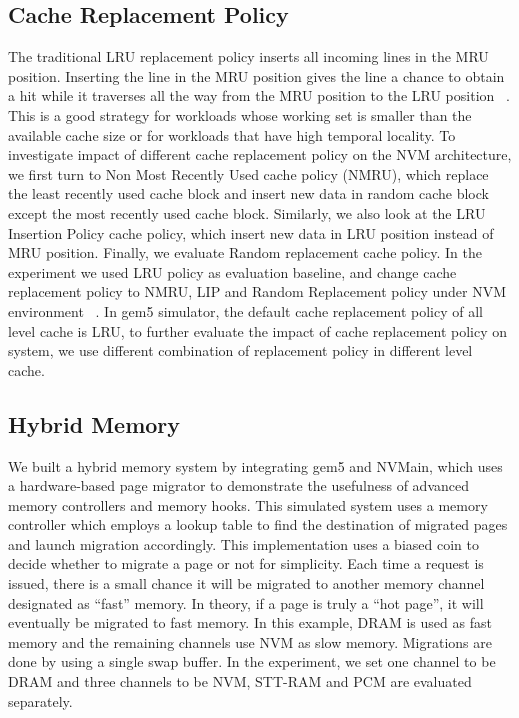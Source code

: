 \subsection{Cache Replacement Policy}
The traditional LRU replacement policy inserts all incoming lines in the MRU position. Inserting the line in the MRU position gives the line a chance to obtain a hit while it traverses all the way from the MRU position to the LRU position ~\cite{fan}. This is a good strategy for workloads whose working set is smaller than the available cache size or for workloads that have high temporal locality. To investigate impact of different cache replacement policy on the NVM architecture, we first turn to Non Most Recently Used cache policy (NMRU), which replace the least recently used cache block and insert new data in random cache block except the most recently used cache block. Similarly, we also look at the LRU Insertion Policy cache policy, which insert new data in LRU position instead of MRU position. Finally, we evaluate Random replacement cache policy.  In the experiment we used LRU policy as evaluation baseline, and change cache replacement policy to NMRU, LIP and Random Replacement policy under NVM environment ~\cite{Qureshi}. In gem5 simulator, the default cache replacement policy of all level cache is LRU, to further evaluate the impact of cache replacement policy on system, we use different combination of replacement policy in different level cache.     



\subsection{Hybrid Memory}
We built a hybrid memory system by integrating gem5 and NVMain, which uses a hardware-based page migrator to demonstrate the usefulness of advanced memory controllers and memory hooks. This simulated system uses a memory controller which employs a lookup table to find the destination of migrated pages and launch migration accordingly. This implementation uses a biased coin to decide whether to migrate a page or not for simplicity. Each time a request is issued, there is a small chance it will be migrated to another memory channel designated as “fast” memory. In theory, if a page is truly a “hot page”, it will eventually be migrated to fast memory. In this example, DRAM is used as fast memory and the remaining channels use NVM as slow memory. Migrations are done by using a single swap buffer. In the experiment, we set one channel to be DRAM and three channels to be NVM, STT-RAM and PCM are evaluated separately.   





